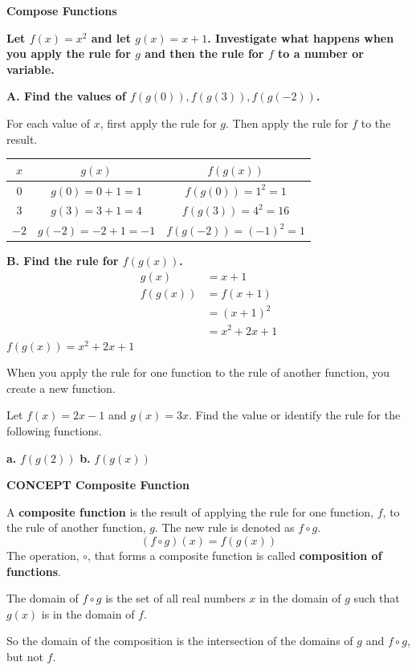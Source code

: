 \documentclass{article}
\newenvironment{concept-box}{}{}
\newenvironment{example}[1]{}{}
\newenvironment{tryit}[1]{}{}
\begin{document}
\begin{example}{4}
\textbf{Compose Functions}

\textbf{Let $f(x) = x^2$ and let $g(x) = x + 1$. Investigate what happens when you apply the rule for $g$ and then the rule for $f$ to a number or variable.}

\textbf{A. Find the values of $f(g(0)), f(g(3)), f(g(-2))$.}

For each value of $x$, first apply the rule for $g$. Then apply the rule for $f$ to the result.

\begin{center}
\begin{tabular}{c|c|c}
\toprule
$x$ & $g(x)$ & $f(g(x))$ \\
\midrule
$0$ & $g(0) = 0 + 1 = 1$ & $f(g(0)) = 1^2 = 1$ \\
$3$ & $g(3) = 3 + 1 = 4$ & $f(g(3)) = 4^2 = 16$ \\
$-2$ & $g(-2) = -2 + 1 = -1$ & $f(g(-2)) = (-1)^2 = 1$ \\
\bottomrule
\end{tabular}
\end{center}

\textbf{B. Find the rule for $f(g(x))$.}
\begin{align*}
g(x) &= x + 1 \\
f(g(x)) &= f(x + 1) \\
&= (x + 1)^2 \\
&= x^2 + 2x + 1
\end{align*}
$f(g(x)) = x^2 + 2x + 1$

When you apply the rule for one function to the rule of another function, you create a new function.
\end{example}

\begin{tryit}{4}
Let $f(x) = 2x - 1$ and $g(x) = 3x$. Find the value or identify the rule for the following functions.

\textbf{a.} $f(g(2))$ \qquad \textbf{b.} $f(g(x))$
\end{tryit}

\begin{concept-box}
\textbf{CONCEPT Composite Function}

A \textbf{composite function} is the result of applying the rule for one function, $f$, to the rule of another function, $g$. The new rule is denoted as $f \circ g$.
\[ (f \circ g)(x) = f(g(x)) \]
The operation, $\circ$, that forms a composite function is called \textbf{composition of functions}.

The domain of $f \circ g$ is the set of all real numbers $x$ in the domain of $g$ such that $g(x)$ is in the domain of $f$.

So the domain of the composition is the intersection of the domains of $g$ and $f \circ g$, but not $f$.
\end{concept-box}
\end{document}
